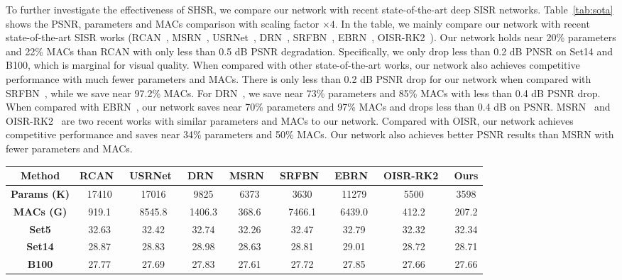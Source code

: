 \documentclass[manuscript,screen]{acmart}
\begin{document}
To further investigate the effectiveness of SHSR, we compare our network with recent state-of-the-art deep SISR networks. Table~\ref{tab:sota} shows the PSNR, parameters and MACs comparison with scaling factor $\times4$. In the table, we mainly compare our network with recent state-of-the-art SISR works (RCAN~\cite{rcan_eccv2018}, MSRN~\cite{msrn_eccv2018}, USRNet~\cite{usrnet_cvpr2020}, DRN~\cite{drn_cvpr2020}, SRFBN~\cite{srfbn_cvpr2019}, EBRN~\cite{ebrn_iccv2019}, OISR-RK2~\cite{oisr_cvpr2019}). Our network holds near 20\% parameters and 22\% MACs than RCAN with only less than 0.5 dB PSNR degradation. Specifically, we only drop less than 0.2 dB PNSR on Set14 and B100, which is marginal for visual quality. When compared with other state-of-the-art works, our network also achieves competitive performance with much fewer parameters and MACs. There is only less than 0.2 dB PSNR drop for our network when compared with SRFBN~\cite{srfbn_cvpr2019}, while we save near 97.2\% MACs. For DRN~\cite{drn_cvpr2020}, we save near 73\% parameters and 85\% MACs with less than 0.4 dB PSNR drop. When compared with EBRN~\cite{ebrn_iccv2019}, our network saves near 70\% parameters and 97\% MACs and drops less than 0.4 dB on PSNR. MSRN~\cite{msrn_eccv2018} and OISR-RK2~\cite{oisr_cvpr2019} are two recent works with similar parameters and MACs to our network. Compared with OISR, our network achieves competitive performance and saves near 34\% parameters and 50\% MACs. Our network also achieves better PSNR results than MSRN with fewer parameters and MACs.

\begin{table*}[t]
	\centering
	\caption{PSNR, parameters and MACs comparisons with state-of-the-art SISR works with scaling factor $\times4$.}
	\label{tab:sota}
	\fontsize{6.5}{8}\selectfont
	\begin{tabular}{|c|c|c|c|c|c|c|c||c|}
		\hline
		\textbf{Method}& \textbf{RCAN~\cite{rcan_eccv2018}}& \textbf{USRNet~\cite{usrnet_cvpr2020}}& \textbf{DRN~\cite{drn_cvpr2020}}& \textbf{MSRN~\cite{msrn_eccv2018}} & \textbf{SRFBN~\cite{srfbn_cvpr2019}}& \textbf{EBRN~\cite{ebrn_iccv2019}}& \textbf{OISR-RK2~\cite{oisr_cvpr2019}}& \textbf{Ours} \\
		\hline
		\hline
		\textbf{Params (K)}& 17410& 17016& 9825& 6373& 3630& 11279& 	  5500		&3598 \\
		\textbf{MACs (G)}& 919.1& 8545.8& 1406.3& 368.6& 7466.1& 6439.0&  412.2		&207.2 \\
		\hline
		\hline
		\textbf{Set5}& 32.63& 32.42& 32.74& 32.26& 32.47& 32.79& 		  32.32		&32.34 \\
		\textbf{Set14}& 28.87& 28.83& 28.98& 28.63& 28.81& 29.01& 		  28.72		&28.71 \\
		\textbf{B100}& 27.77& 27.69& 27.83& 27.61& 27.72& 27.85& 		  27.66		&27.66 \\
\hline
	\end{tabular}
\end{table*}
\end{document}
